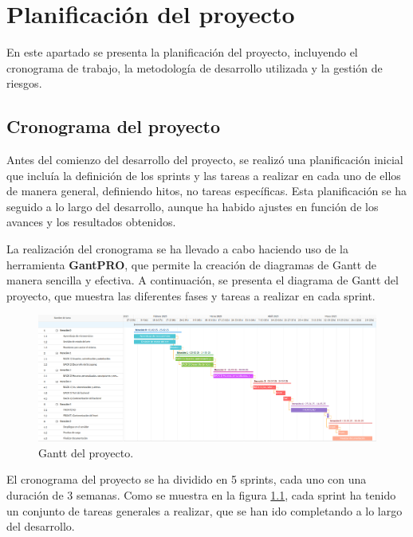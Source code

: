 \chapter{Planificación del proyecto}\label{cap:planificacion}

En este apartado se presenta la planificación del proyecto, incluyendo el cronograma de trabajo, la metodología de desarrollo utilizada y la gestión de riesgos.

\section{Cronograma del proyecto}

Antes del comienzo del desarrollo del proyecto, se realizó una planificación inicial que incluía la definición de los sprints y las tareas a realizar en cada uno de ellos de manera general, definiendo hitos, no tareas específicas. Esta planificación se ha seguido a lo largo del desarrollo, aunque ha habido ajustes en función de los avances y los resultados obtenidos.

La realización del cronograma se ha llevado a cabo haciendo uso de la herramienta \textbf{GantPRO}\cite{webGanttPro}, que permite la creación de diagramas de Gantt de manera sencilla y efectiva. A continuación, se presenta el diagrama de Gantt del proyecto, que muestra las diferentes fases y tareas a realizar en cada sprint.

\begin{figure}[ht!] 
    \centering 
    \includegraphics[width=1\textwidth]{figures/04_gantt.png}
    \caption{Gantt del proyecto.} 
    \label{gantt}
\end{figure}

El cronograma del proyecto se ha dividido en 5 sprints, cada uno con una duración de 3 semanas. Como se muestra en la figura \ref{gantt}, cada sprint ha tenido un conjunto de tareas generales a realizar, que se han ido completando a lo largo del desarrollo.

